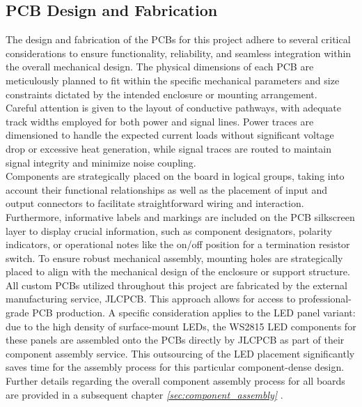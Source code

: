 \subsection{PCB Design and Fabrication}
The design and fabrication of the \ac{PCB}s for this project adhere to several critical considerations to ensure functionality, reliability, and seamless integration within the overall mechanical design. The physical dimensions of each \ac{PCB} are meticulously planned to fit within the specific mechanical parameters and size constraints dictated by the intended enclosure or mounting arrangement. \\

Careful attention is given to the layout of conductive pathways, with adequate track widths employed for both power and signal lines. Power traces are dimensioned to handle the expected current loads without significant voltage drop or excessive heat generation, while signal traces are routed to maintain signal integrity and minimize noise coupling. \\

Components are strategically placed on the board in logical groups, taking into account their functional relationships as well as the placement of input and output connectors to facilitate straightforward wiring and interaction. Furthermore, informative labels and markings are included on the \ac{PCB} silkscreen layer to display crucial information, such as component designators, polarity indicators, or operational notes like the on/off position for a termination resistor switch. To ensure robust mechanical assembly, mounting holes are strategically placed to align with the mechanical design of the enclosure or support structure. \\

All custom \ac{PCB}s utilized throughout this project are fabricated by the external manufacturing service, JLCPCB. This approach allows for access to professional-grade \ac{PCB} production. A specific consideration applies to the \ac{LED} panel variant: due to the high density of surface-mount \ac{LED}s, the WS2815 \ac{LED} components for these panels are assembled onto the \ac{PCB}s directly by JLCPCB as part of their component assembly service. This outsourcing of the \ac{LED} placement significantly saves time for the assembly process for this particular component-dense design. Further details regarding the overall component assembly process for all boards are provided in a subsequent chapter \textit{\ref{sec:component_assembly} }.

